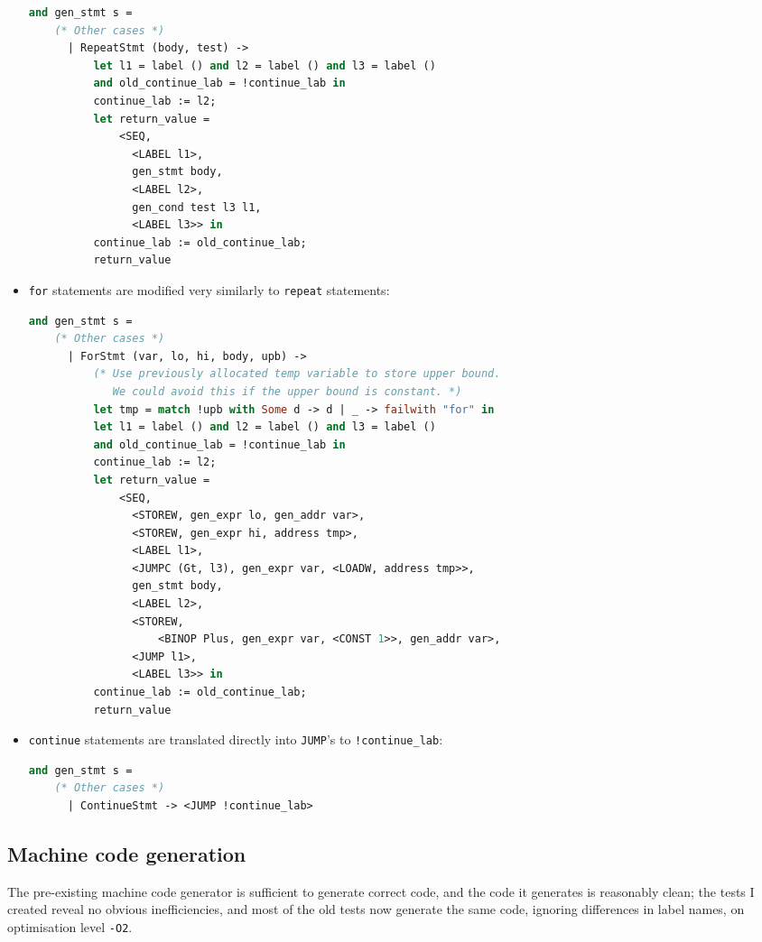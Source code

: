 \documentclass[a4paper,10pt]{article}
\begin{document}
\begin{itemize}
\begin{lstlisting}[language=ml]
and gen_stmt s = 
    (* Other cases *)
      | RepeatStmt (body, test) ->
          let l1 = label () and l2 = label () and l3 = label ()
          and old_continue_lab = !continue_lab in
          continue_lab := l2;
          let return_value = 
              <SEQ,
                <LABEL l1>,
                gen_stmt body, 
                <LABEL l2>,
                gen_cond test l3 l1,
                <LABEL l3>> in
          continue_lab := old_continue_lab;
          return_value
\end{lstlisting}
    \item \texttt{for} statements are modified very similarly to \texttt{repeat} statements:
\begin{lstlisting}[language=ml]
and gen_stmt s = 
    (* Other cases *)
      | ForStmt (var, lo, hi, body, upb) ->
          (* Use previously allocated temp variable to store upper bound.
             We could avoid this if the upper bound is constant. *)
          let tmp = match !upb with Some d -> d | _ -> failwith "for" in
          let l1 = label () and l2 = label () and l3 = label ()
          and old_continue_lab = !continue_lab in
          continue_lab := l2;
          let return_value =
              <SEQ,
                <STOREW, gen_expr lo, gen_addr var>,
                <STOREW, gen_expr hi, address tmp>,
                <LABEL l1>,
                <JUMPC (Gt, l3), gen_expr var, <LOADW, address tmp>>,
                gen_stmt body,
                <LABEL l2>,
                <STOREW,
                    <BINOP Plus, gen_expr var, <CONST 1>>, gen_addr var>,
                <JUMP l1>,
                <LABEL l3>> in
          continue_lab := old_continue_lab;
          return_value
\end{lstlisting}
    \item \texttt{continue} statements are translated directly into \texttt{JUMP}'s to \texttt{!continue\_lab}:
\begin{lstlisting}[language=ml]
and gen_stmt s = 
    (* Other cases *)
      | ContinueStmt -> <JUMP !continue_lab>
\end{lstlisting}
\end{itemize}
\subsection{Machine code generation}
The pre-existing machine code generator is sufficient to generate correct code, and the code it generates is reasonably clean; the tests I created reveal no obvious inefficiencies, and most of the old tests now generate the same code, ignoring differences in label names, on optimisation level \texttt{-O2}.
\end{document}
